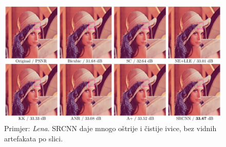 \documentclass[12pt]{report}
\newtheorem{defn}{Definicija}[chapter]
\newtheorem{thm}{Teorema}[chapter]
\newtheorem{cor}{Posljedica}[chapter]
\newtheorem{example}{Primjer}[chapter]
\numberwithin{equation}{section}
\begin{document}
 
 
\begin{figure}
\centering
\includegraphics[scale=0.45]{SLIKE/lena}
\caption{Primjer: \textit{Lena}. SRCNN daje mnogo oštrije i čistije ivice, bez vidnih artefakata po slici.}
\label{fig:primjer}
\end{figure} 
 
 
  






\end{document}
